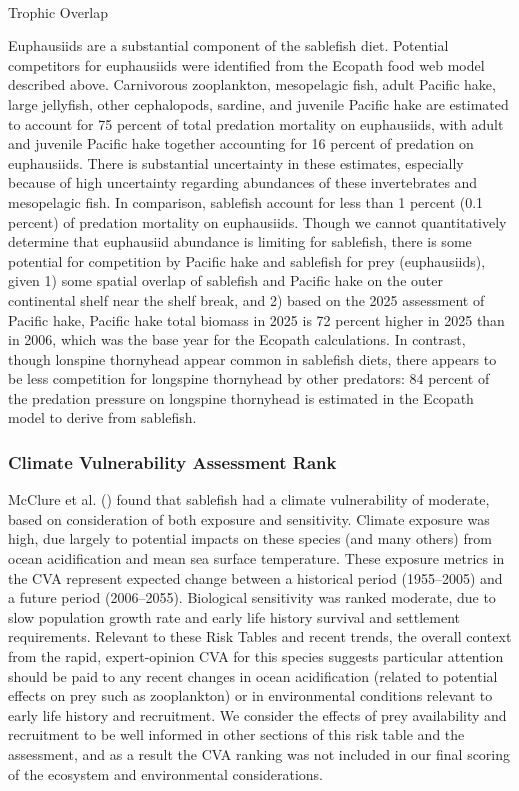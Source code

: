 \documentclass[
  english,
]{article}
\makeatletter
\let\oldparagraph\paragraph
\renewcommand{\paragraph}{
    \@ifstar
      \xxxParagraphStar
      \xxxParagraphNoStar
  }
\newcommand{\xxxParagraphStar}[1]{\oldparagraph*{#1}\mbox{}}
\newcommand{\xxxParagraphNoStar}[1]{\oldparagraph{#1}\mbox{}}
\makeatother
\begin{document}
\paragraph{Trophic Overlap}\label{trophic-overlap}

Euphausiids are a substantial component of the sablefish diet. Potential
competitors for euphausiids were identified from the Ecopath food web
model described above. Carnivorous zooplankton, mesopelagic fish, adult
Pacific hake, large jellyfish, other cephalopods, sardine, and juvenile
Pacific hake are estimated to account for 75 percent of total predation
mortality on euphausiids, with adult and juvenile Pacific hake together
accounting for 16 percent of predation on euphausiids. There is
substantial uncertainty in these estimates, especially because of high
uncertainty regarding abundances of these invertebrates and mesopelagic
fish. In comparison, sablefish account for less than 1 percent (0.1
percent) of predation mortality on euphausiids. Though we cannot
quantitatively determine that euphausiid abundance is limiting for
sablefish, there is some potential for competition by Pacific hake and
sablefish for prey (euphausiids), given 1) some spatial overlap of
sablefish and Pacific hake on the outer continental shelf near the shelf
break, and 2) based on the 2025 assessment of Pacific hake, Pacific hake
total biomass in 2025 is 72 percent higher in 2025 than in 2006, which
was the base year for the Ecopath calculations. In contrast, though
lonspine thornyhead appear common in sablefish diets, there appears to
be less competition for longspine thornyhead by other predators: 84
percent of the predation pressure on longspine thornyhead is estimated
in the Ecopath model to derive from sablefish.

\subsubsection{Climate Vulnerability Assessment
Rank}\label{climate-vulnerability-assessment-rank}

McClure et al. () found that
sablefish had a climate vulnerability of moderate, based on
consideration of both exposure and sensitivity. Climate exposure was
high, due largely to potential impacts on these species (and many
others) from ocean acidification and mean sea surface temperature. These
exposure metrics in the CVA represent expected change between a
historical period (1955--2005) and a future period (2006--2055).
Biological sensitivity was ranked moderate, due to slow population
growth rate and early life history survival and settlement requirements.
Relevant to these Risk Tables and recent trends, the overall context
from the rapid, expert-opinion CVA for this species suggests particular
attention should be paid to any recent changes in ocean acidification
(related to potential effects on prey such as zooplankton) or in
environmental conditions relevant to early life history and recruitment.
We consider the effects of prey availability and recruitment to be well
informed in other sections of this risk table and the assessment, and as
a result the CVA ranking was not included in our final scoring of the
ecosystem and environmental considerations.
\end{document}
